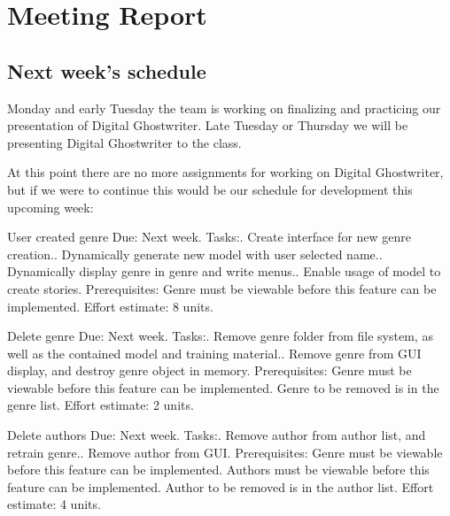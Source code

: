\documentclass[12pt]{article}
\begin{document}
\section{Meeting Report }

\subsection{Next week's schedule}
Monday and early Tuesday the team is working on finalizing and practicing our presentation of Digital Ghostwriter.
Late Tuesday or Thursday we will be presenting Digital Ghostwriter to the class.

At this point there are no more assignments for working on Digital Ghostwriter, but if we were to continue this would be our schedule for development this upcoming week:

User created genre\newline
Due: Next week.\newline
Tasks:. Create interface for new genre creation.. Dynamically generate new model with user selected name.. Dynamically display genre in genre and write menus.. Enable usage of model to create stories.\newline
Prerequisites:\newline
Genre must be viewable before this feature can be implemented.\newline
Effort estimate: 8 units.

Delete genre\newline
Due: Next week.\newline
Tasks:. Remove genre folder from file system, as well as the contained model and
training material.. Remove genre from GUI display, and destroy genre object in memory.\newline
Prerequisites:\newline
Genre must be viewable before this feature can be implemented.\newline
Genre to be removed is in the genre list.\newline
Effort estimate: 2 units.

Delete authors\newline
Due: Next week.\newline
Tasks:. Remove author from author list, and retrain genre.. Remove author from GUI.\newline
Prerequisites:\newline
Genre must be viewable before this feature can be implemented.\newline
Authors must be viewable before this feature can be implemented.\newline
Author to be removed is in the author list.\newline
Effort estimate: 4 units.
\end{document}
